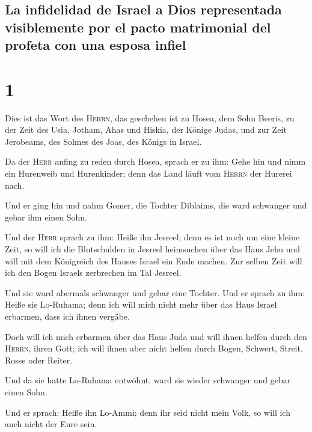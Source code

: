 \hypertarget{la-infidelidad-de-israel-a-dios-representada-visiblemente-por-el-pacto-matrimonial-del-profeta-con-una-esposa-infiel}{%
\subsection{La infidelidad de Israel a Dios representada visiblemente
por el pacto matrimonial del profeta con una esposa
infiel}\label{la-infidelidad-de-israel-a-dios-representada-visiblemente-por-el-pacto-matrimonial-del-profeta-con-una-esposa-infiel}}

\hypertarget{section}{%
\section{1}\label{section}}

 Dies ist das Wort des \textsc{Herrn}, das geschehen ist
zu Hosea, dem Sohn Beeris, zu der Zeit des Usia, Jotham, Ahas und
Hiskia, der Könige Judas, und zur Zeit Jerobeams, des Sohnes des Joas,
des Königs in Israel.

 Da der \textsc{Herr} anfing zu reden durch Hosea, sprach
er zu ihm: Gehe hin und nimm ein Hurenweib und Hurenkinder; denn das
Land läuft vom \textsc{Herrn} der Hurerei nach.

 Und er ging hin und nahm Gomer, die Tochter Diblaims, die
ward schwanger und gebar ihm einen Sohn.

 Und der \textsc{Herr} sprach zu ihm: Heiße ihn Jesreel;
denn es ist noch um eine kleine Zeit, so will ich die Blutschulden in
Jesreel heimsuchen über das Haus Jehu und will mit dem Königreich des
Hauses Israel ein Ende machen.  Zur selben Zeit will ich
den Bogen Israels zerbrechen im Tal Jesreel.

 Und sie ward abermals schwanger und gebar eine Tochter.
Und er sprach zu ihm: Heiße sie Lo-Ruhama; denn ich will mich nicht mehr
über das Haus Israel erbarmen, dass ich ihnen vergäbe.

 Doch will ich mich erbarmen über das Haus Juda und will
ihnen helfen durch den \textsc{Herrn}, ihren Gott; ich will ihnen aber
nicht helfen durch Bogen, Schwert, Streit, Rosse oder Reiter.

 Und da sie hatte Lo-Ruhama entwöhnt, ward sie wieder
schwanger und gebar einen Sohn.

 Und er sprach: Heiße ihn Lo-Ammi; denn ihr seid nicht
mein Volk, so will ich auch nicht der Eure sein.

